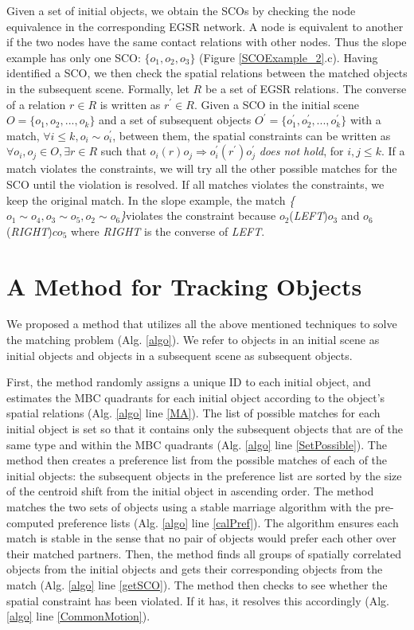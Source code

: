 \documentclass[letterpaper]{article}
\begin{document}
Given a set of initial objects, we obtain the SCOs by checking the node equivalence in the corresponding EGSR network. A node is equivalent to another if the two nodes have the same contact relations with other nodes. Thus the slope example has only one SCO: $\{o_1, o_2, o_3\}$ (Figure \ref{SCOExample_2}.c). Having identified a SCO, we then check the spatial relations between the matched objects in the subsequent scene. Formally, let $R$ be a set of EGSR relations. The converse of a relation $r \in R$ is written as $r^{\prime} \in R$. Given a SCO in the initial scene $O = \{o_1, o_2, ... , o_k\}$ and a set of subsequent objects $O^\prime = \{o^{\prime}_1, o^{\prime}_2, ..., o^{\prime}_k \}$ with a match, $\forall i\leq k, o_i \sim o^{\prime}_i$, between them, the spatial constraints can be written as $\forall o_i,o_j\in O, \exists r\in R$ such that $o_i (r) o_j \Rightarrow o^{\prime}_i (r^{\prime}) o^{\prime}_j$ \emph{does not hold}, for $i,j \leq k$. If a match violates the constraints, we will try all the other possible matches for the SCO until the violation is resolved. If all matches violates the constraints, we keep the original match. In the slope example, the match \emph{\{$o_1\sim o_4, o_3\sim o_5, o_2 \sim o_6$\}}violates the constraint because $o_2$(\emph{LEFT})$o_3$ and $o_6$(\emph{RIGHT})$co_5$ where \emph{RIGHT} is the converse of \emph{LEFT}.




\section{A Method for Tracking Objects}

We proposed a method that utilizes all the above mentioned techniques to solve the matching problem (Alg. \ref{algo}). We refer to objects in an initial scene as initial objects and objects in a subsequent scene as subsequent objects.

First, the method randomly assigns a unique ID to each initial object, and estimates the MBC quadrants for each initial object according to the object's spatial relations (Alg. \ref{algo} line \ref{MA}). The list of possible matches for each initial object is set so that it contains only the subsequent objects that are of the same type and within the MBC quadrants (Alg. \ref{algo} line \ref{SetPossible}). The method then creates a preference list from the possible matches of each of the initial objects: the subsequent objects in the preference list are sorted by the size of the centroid shift from the initial object in ascending order. The method matches the two sets of objects using a stable marriage algorithm \cite{gale1962college} with the pre-computed preference lists (Alg. \ref{algo} line \ref{calPref}). The algorithm ensures each match is stable in the sense that no pair of objects would prefer each other over their matched partners. Then, the method finds all groups of spatially correlated objects from the initial objects and gets their corresponding objects from the match (Alg. \ref{algo} line \ref{getSCO}). The method then checks to see whether the spatial constraint  has been violated. If it has, it resolves this accordingly (Alg. \ref{algo} line \ref{CommonMotion}).
\end{document}
